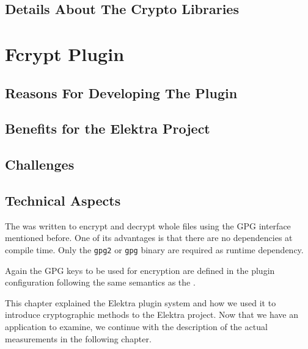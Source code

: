 \subsection{Details About The Crypto Libraries}\label{details-about-the-crypto-libraries}



\section{Fcrypt Plugin}\label{fcrypt-plugin}

\subsection{Reasons For Developing The Plugin}


\subsection{Benefits for the Elektra Project}


\subsection{Challenges}


\subsection{Technical Aspects}



The \fcrypt{} was written to encrypt and decrypt whole files using the GPG interface mentioned before.
One of its advantages is that there are no dependencies at compile time.
Only the \texttt{gpg2} or \texttt{gpg} binary are required as runtime dependency.

Again the GPG keys to be used for encryption are defined in the plugin configuration following the same semantics as the \crypto{}.


This chapter explained the Elektra plugin system and how we used it to introduce cryptographic methods to the Elektra project.
Now that we have an application to examine, we continue with the description of the actual measurements in the following chapter.

